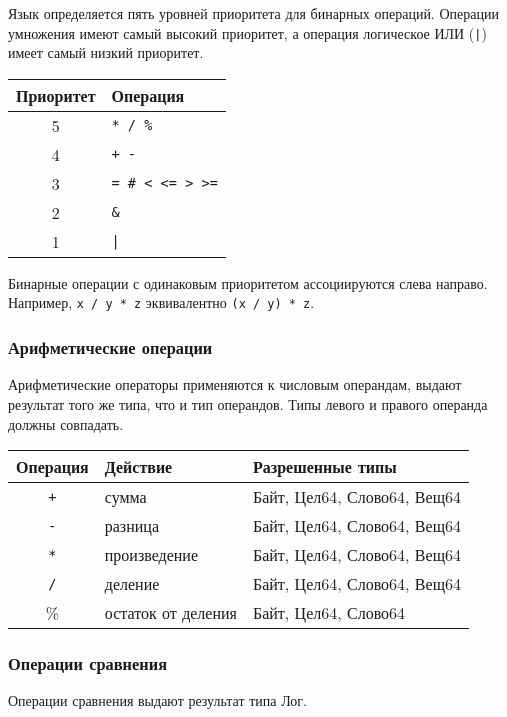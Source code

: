 Язык определяется пять уровней приоритета для бинарных операций. Операции умножения имеют самый высокий приоритет, а операция логическое ИЛИ (\verb+|+) имеет самый низкий приоритет.

\begin{tabular}[c]{c|l}
\textbf{Приоритет} & \textbf{Операция} \\ 
\hline
5 &   \verb#* / %# \\
4 &   \verb#+ -# \\
3 &   \verb|= # < <= > >=| \\
2 &   \verb#&# \\
1 &  \verb#|# \\
\hline
\end{tabular}

\bigskip
Бинарные операции с одинаковым приоритетом ассоциируются слева направо. Например, \verb|x / y * z| эквивалентно \verb|(x / y) * z|.

\hypertarget{ops-arithmetic}{%
\subsubsection{Арифметические операции}\label{expr:ops-arithmetic}}

Арифметические операторы применяются к числовым операндам, выдают результат того же типа, что и тип операндов.
Типы левого и правого операнда должны совпадать. 

\bigskip
\begin{tabular}[c]{c|l|l}
\textbf{Операция} & \textbf{Действие} & \textbf{Разрешенные типы} \\ 
\hline
\verb|+| & сумма & Байт, Цел64, Слово64, Вещ64 \\
\verb|-| &  разница & Байт, Цел64, Слово64, Вещ64 \\
\verb|*| & произведение & Байт, Цел64, Слово64, Вещ64 \\
\verb|/| &  деление & Байт, Цел64, Слово64, Вещ64\\
\% & остаток от деления  &  Байт, Цел64, Слово64 \\
\hline
\end{tabular}


\hypertarget{ops-comparison}{%
\subsubsection{Операции сравнения}\label{expr:ops-comparison}}

Операции сравнения выдают результат типа Лог. 

